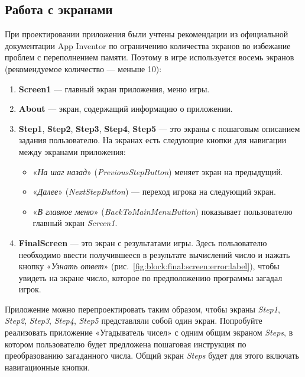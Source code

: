 \subsection{Работа с экранами}
При проектировании приложения были учтены рекомендации из официальной документации App Inventor\cite{MitManyScreens} по ограничению количества экранов во избежание проблем с переполнением памяти.
Поэтому в игре используется восемь экранов (рекомендуемое количество — меньше 10):
\begin{enumerate}
\item \textbf{Screen1} — главный экран приложения, меню игры.
\item \textbf{About} — экран, содержащий информацию о приложении.
\item \textbf{Step1}, \textbf{Step2}, \textbf{Step3}, \textbf{Step4}, \textbf{Step5} — это экраны с пошаговым описанием задания пользователю. На экранах есть следующие кнопки для навигации между экранами приложения:
\begin{itemize}
  \item «\textit{На шаг назад}» (\textit{PreviousStepButton}) меняет экран на предыдущий.
  \item «\textit{Далее}» (\textit{NextStepButton}) — переход игрока на следующий экран.
  \item «\textit{В главное меню}» (\textit{BackToMainMenuButton}) показывает пользователю главный экран \textit{Screen1}.
\end{itemize}
\item \textbf{FinalScreen} — это экран с результатами игры. Здесь пользователю необходимо ввести получившееся в результате вычислений число и нажать кнопку «\textit{Узнать ответ}» (рис.~\ref{fig:block:final:screen:error:label}), чтобы увидеть на экране число, которое по предположению программы загадал игрок.
\end{enumerate}

\begin{mdfstyle}[nobreak=true,frametitle=Упражнение]
\sloppy Приложение можно перепроектировать таким образом, чтобы экраны \textit{Step1}, \textit{Step2}, \textit{Step3}, \textit{Step4}, \textit{Step5} представляли собой один экран. Попробуйте реализовать приложение «Угадыватель чисел» с одним общим экраном \textit{Steps}, в котором пользователю будет предложена пошаговая инструкция по преобразованию загаданного числа. Общий экран \textit{Steps} будет для этого включать навигационные кнопки.\end{mdfstyle}

